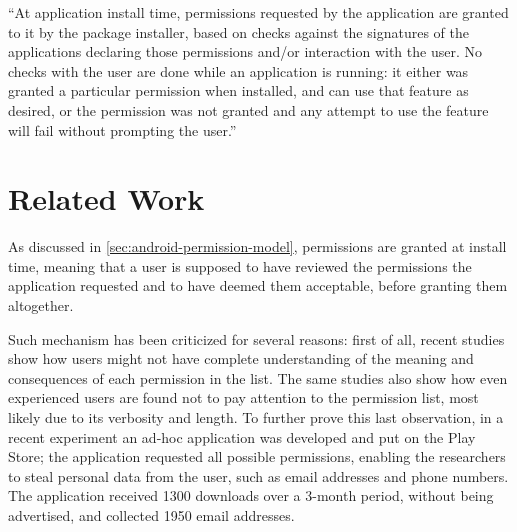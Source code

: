 ``At application install time, permissions requested by the application are granted to it by the package installer, based on checks against the signatures of the applications declaring those permissions and/or interaction with the user.
No checks with the user are done while an application is running: it either was granted a particular permission when installed, and can use that feature as desired, or the permission was not granted and any attempt to use the feature will fail without prompting the user.''\cite{android-developer-guide}

\section{Related Work}
As discussed in \autoref{sec:android-permission-model}, permissions are granted at install time, meaning that a user is supposed to have reviewed the permissions the application requested and to have deemed them acceptable, before granting them altogether.

Such mechanism has been criticized for several reasons: first of all, recent studies \cite{Felt:2012:APU:2335356.2335360} \cite{Kelley:2012:CPI:2426020.2426027} show how users might not have complete understanding of the meaning and consequences of each permission in the list. The same studies also show how even experienced users are found not to pay attention to the permission list, most likely due to its verbosity and length. To further prove this last observation, in a recent experiment \cite{stickley} an ad-hoc application was developed and put on the Play Store; the application requested all possible permissions, enabling the researchers to steal personal data from the user, such as email addresses and phone numbers. The application received 1300 downloads over a 3-month period, without being advertised, and collected 1950 email addresses.

